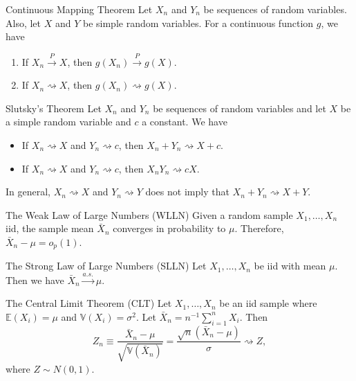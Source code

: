 \documentclass[avery5371,grid]{flashcards}
\begin{document}
\begin{flashcard}[Theorem]{Continuous Mapping Theorem}
Let $X_n$ and $Y_n$ be sequences of random variables. Also, let $X$ and $Y$ be simple random variables. For a continuous function $g$, we have
\begin{enumerate}
 \item If $X_n \overset{P} \to X$, then $g(X_n) \overset{P} \to g(X)$.
 \item If $X_n \rightsquigarrow X$, then $g(X_n) \rightsquigarrow g(X)$.
\end{enumerate}
\end{flashcard}

\begin{flashcard}[Theorem]{Slutsky's Theorem}
Let $X_n$ and $Y_n$ be sequences of random variables and let $X$  be a simple random variable and $c$ a constant. We have 
\begin{itemize}
 \item If $X_n \rightsquigarrow X$ and $Y_n \rightsquigarrow c$, then $X_n + Y_n \rightsquigarrow X + c$.
 \item If $X_n \rightsquigarrow X$ and $Y_n \rightsquigarrow c$, then $X_nY_n \rightsquigarrow cX$.
\end{itemize}
In general, $X_n \rightsquigarrow X$ and $Y_n \rightsquigarrow Y$ does not imply that $X_n + Y_n \rightsquigarrow X + Y$.
\end{flashcard}

\begin{flashcard}[Theorem]{The Weak Law of Large Numbers (WLLN)}
Given a random sample $X_1, \ldots, X_n$ iid, the sample mean $\bar X_n$ converges in probability to $\mu$. Therefore, $\bar X_n - \mu = o_p(1)$. 
\end{flashcard}

\begin{flashcard}[Theorem]{The Strong Law of Large Numbers (SLLN) }
Let $X_1,\ldots, X_n$ be iid with mean $\mu$. Then we have $\bar X_n \overset{a.s.} \longrightarrow \mu$. 
\end{flashcard}

\begin{flashcard}[Theorem]{The Central Limit Theorem (CLT)}
Let $X_1, \ldots, X_n$ be an iid sample where $\mathbb E (X_i) = \mu$ and $\mathbb V (X_i) = \sigma^2$. Let $\bar X_n = n^{-1} \sum_{i=1}^n X_i$. Then 
\[
Z_n \equiv \frac{\bar X_n - \mu}{\sqrt{\mathbb V\left(\bar X_n \right)}} = \frac{\sqrt{n}\left(\bar X_n -\mu \right)}{\sigma} \rightsquigarrow Z, 
\]
where $Z \sim N(0,1)$.
\end{flashcard}
\end{document}
